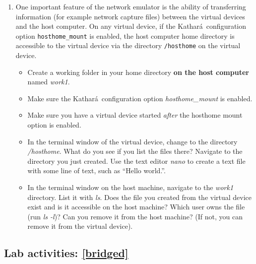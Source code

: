 \documentclass[12pt]{book}
\newcommand{\kathara}{Kathar\'a}
\begin{document}
\begin{enumerate}[resume*]
\item One important feature of the network emulator is the ability of transferring information (for example network capture files) between the virtual devices and the host computer. On any virtual device, if the \kathara\ configuration option \verb$hosthome_mount$ is enabled, the host computer home directory is accessible to the virtual device via the directory \verb$/hosthome$ on the virtual device.

  \begin{itemize}[label=--]
  \item Create a working folder in your home directory \textbf{on the host computer} named \emph{work1}.
  \item Make sure the \kathara\ configuration option \emph{hosthome\_mount} is enabled.
  \item Make sure you have a virtual device started \emph{after} the hosthome mount option is enabled.
  \item In the terminal window of the virtual device, change to the directory \emph{/hosthome}. What do you see if you list the files there? Navigate to the directory you just created. Use the text editor \emph{nano} to create a text file with some line of text, such as ``Hello world.''.
  \item In the terminal window on the host machine, navigate to the \emph{work1} directory. List it with \emph{ls}. Does the file you created from the virtual device exist and is it accessible on the host machine? Which user owns the file (run \emph{ls -l})? Can you remove it from the host machine? (If not, you can remove it from the virtual device).
  \end{itemize}

\end{enumerate}

\subsection{Lab activities: \ref{bridged}}
\end{document}
